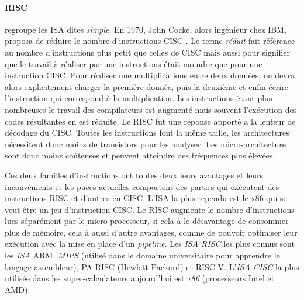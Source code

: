     \paragraph{RISC} regroupe les ISA dites \textit{simple}. En 1970, John Cocke, alors ingénieur chez IBM, proposa de réduire le nombre d'instructions CISC \cite{cocke1990evolution}. Le terme \textit{réduit} fait référence au nombre d'instructions plus petit que celles de CISC mais aussi pour signifier que le travail à réaliser par une instructions était moindre que pour une instruction CISC. Pour réaliser une multiplications entre deux données, on devra alors explicitement charger la première donnée, puis la deuxième et enfin écrire l'instruction qui correspond à la multiplication. Les instructions étant plus nombreuses le travail des compilateurs est augmenté mais souvent l'exécution des codes résultantes en est réduite. Le RISC fut une réponse apporté a la lenteur de décodage du CISC.  Toutes les instructions font la même taille, les architectures nécessitent donc moins de transistors pour les analyser. Les micro-architecture sont donc moins coûteuses et peuvent atteindre des fréquences plus élevées.

Ces deux familles d'instructions ont toutes deux leurs avantages et leurs inconvénients et les puces actuelles comportent des parties qui exécutent des instructions RISC et d'autres en CISC. L'ISA la plus rependu est le x86 qui se veut être un jeu d'instruction CISC. Le RISC augmente le nombre d'instructions lues séparément par le micro-processeur, si cela à le désavantage de consommer plus de mémoire, cela à aussi d'autre avantages, comme de pouvoir optimiser leur exécution avec la mise en place d'un \textit{pipeline}. Les \textit{ISA RISC} les plus connus sont les \textit{ISA} ARM, \textit{MIPS} (utilisé dans le domaine universitaire pour apprendre le langage assembleur), PA-RISC (Hewlett-Packard) et RISC-V. L'\textit{ISA CISC} la plus utilisée dans les super-calculateurs aujourd'hui est \textit{x86} (processeurs Intel et AMD).



